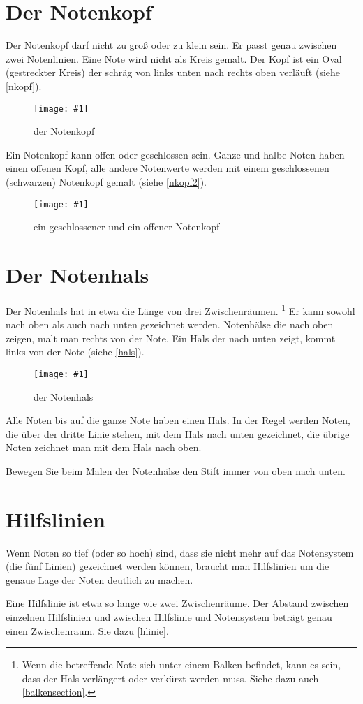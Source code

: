 \documentclass[10pt,a4paper,twoside]{report}
\newcommand{\comment}[1]{\marginpar{\begin{flushleft}
            \textsf{#1}
        \end{flushleft}}}
\newcommand{\image}[4]{
	\begin{figure}[!ht]
		\centering
		\texttt{[image: \#1]}
		\caption{#2}
		\label{#3}
	\end{figure}
}
\begin{document}
\section{Der Notenkopf}
\label{notenkopf}
Der Notenkopf darf nicht zu groß oder zu klein sein. Er passt genau zwischen 
zwei Notenlinien. Eine Note wird nicht als Kreis gemalt. Der Kopf ist ein Oval 
(gestreckter Kreis) der schräg von links unten nach rechts oben verläuft (siehe 
\autoref{nkopf}).

\image{img/nkopfa.png}{der Notenkopf}{nkopf}{7}

Ein Notenkopf kann offen oder geschlossen sein. 
Ganze und halbe Noten haben einen offenen Kopf, alle andere Notenwerte werden
mit einem geschlossenen (schwarzen) Notenkopf gemalt (siehe \autoref{nkopf2}).

\image{img/nkopf2.png}{ein geschlossener und ein offener Notenkopf}{nkopf2}{4}


\section{Der Notenhals}
Der Notenhals hat in etwa die Länge von drei 
\comment{Hals $ \rightarrow $\\ drei Zwischenräume}Zwischenräumen.%
\footnote{Wenn die betreffende Note sich unter einem Balken befindet, kann es sein, dass der Hals verlängert oder verkürzt werden muss. Siehe dazu auch \autoref{balkensection}.}
Er kann sowohl nach 
oben als auch nach unten gezeichnet werden.
Notenhälse die nach oben zeigen, malt man rechts von der Note. Ein Hals der nach 
unten zeigt, kommt links von der Note (siehe \autoref{hals}).
\image{img/hals.png}{der Notenhals}{hals}{4}

Alle Noten bis auf die ganze Note haben einen Hals. In der 
Regel werden Noten, die über der dritte Linie stehen, mit dem 
Hals nach unten gezeichnet, die übrige Noten zeichnet
man mit dem Hals nach oben.

Bewegen Sie beim Malen der Notenhälse den Stift immer von oben 
nach unten.

\section{Hilfslinien}
Wenn Noten so tief (oder so hoch) sind, dass sie nicht mehr auf das
Notensystem (die fünf Linien) gezeichnet werden können, braucht man Hilfslinien
um die genaue Lage der Noten deutlich zu machen.

Eine Hilfslinie ist etwa so lange wie zwei Zwischenräume. Der Abstand
zwischen einzelnen Hilfslinien und zwischen Hilfslinie und Notensystem
beträgt genau einen Zwischenraum. Sie dazu \autoref{hlinie}.
\end{document}
